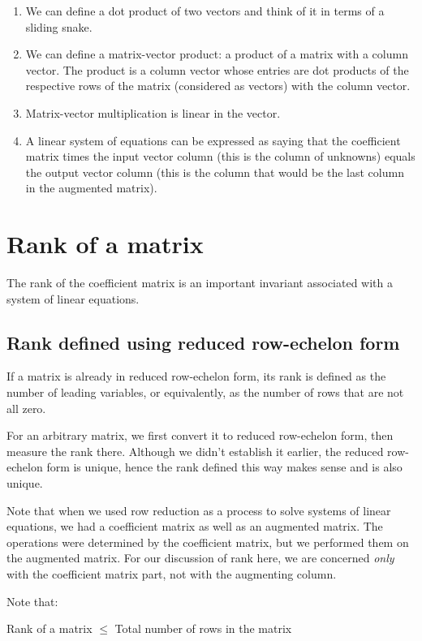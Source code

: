 \documentclass[10pt]{amsart}
\begin{document}
\begin{enumerate}
\item We can define a dot product of two vectors and think of it in
  terms of a sliding snake.
\item We can define a matrix-vector product: a product of a matrix
  with a column vector. The product is a column vector whose entries
  are dot products of the respective rows of the matrix (considered as
  vectors) with the column vector.
\item Matrix-vector multiplication is linear in the vector.
\item A linear system of equations can be expressed as saying that the
  coefficient matrix times the input vector column (this is the column
  of unknowns) equals the output vector column (this is the column
  that would be the last column in the augmented matrix).
\end{enumerate}

\section{Rank of a matrix}

The rank of the coefficient matrix is an important invariant
associated with a system of linear equations.

\subsection{Rank defined using reduced row-echelon form}

If a matrix is already in reduced row-echelon form, its rank is
defined as the number of leading variables, or equivalently, as the
number of rows that are not all zero.

For an arbitrary matrix, we first convert it to reduced row-echelon
form, then measure the rank there. Although we didn't establish it
earlier, the reduced row-echelon form is unique, hence the rank
defined this way makes sense and is also unique.

Note that when we used row reduction as a process to solve systems of
linear equations, we had a coefficient matrix as well as an augmented
matrix. The operations were determined by the coefficient matrix, but
we performed them on the augmented matrix. For our discussion of rank
here, we are concerned {\em only} with the coefficient matrix part,
not with the augmenting column.

Note that:

Rank of a matrix $\le$ Total number of rows in the matrix
\end{document}
